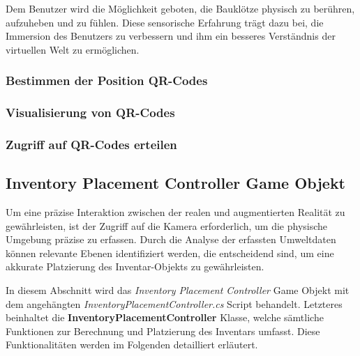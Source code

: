 Dem Benutzer wird die Möglichkeit geboten, die Bauklötze physisch zu berühren, aufzuheben und zu fühlen. Diese sensorische
Erfahrung trägt dazu bei, die Immersion des Benutzers zu verbessern und ihm ein besseres Verständnis der virtuellen Welt
zu ermöglichen.

\subsubsection{Bestimmen der Position QR-Codes}

\subsubsection{Visualisierung von QR-Codes}

\subsubsection{Zugriff auf QR-Codes erteilen}

\subsection{Inventory Placement Controller Game Objekt}
Um eine präzise Interaktion zwischen der realen und augmentierten Realität zu gewährleisten, ist der Zugriff auf die Kamera
erforderlich, um die physische Umgebung präzise zu erfassen. Durch die Analyse der erfassten Umweltdaten können relevante
Ebenen identifiziert werden, die entscheidend sind, um eine akkurate Platzierung des Inventar-Objekts zu gewährleisten.

In diesem Abschnitt wird das \textit{Inventory Placement Controller} Game Objekt mit dem angehängten \textit{InventoryPlacementController.cs}
Script behandelt. Letzteres beinhaltet die \textbf{InventoryPlacementController} Klasse, welche sämtliche Funktionen zur
Berechnung und Platzierung des Inventars umfasst. Diese Funktionalitäten werden im Folgenden detailliert erläutert.

